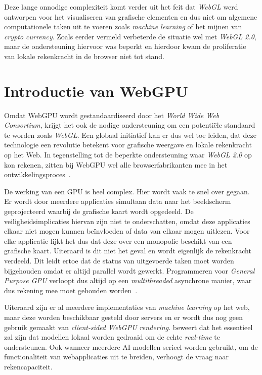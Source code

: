 \bigbreak{}

Deze lange onnodige complexiteit komt verder uit het feit dat \textit{WebGL} werd ontworpen voor het visualiseren van grafische elementen en dus niet om algemene computationele taken uit te voeren zoals \textit{machine learning} of het mijnen van \textit{crypto currency}. Zoals eerder vermeld verbeterde de situatie wel met \textit{WebGL 2.0}, maar de ondersteuning hiervoor was beperkt en hierdoor kwam de proliferatie van lokale rekenkracht in de browser niet tot stand.

\break{}

\section{Introductie van WebGPU}
\label{sec:IntroWebGPU}

Omdat WebGPU wordt gestandaardiseerd door het \textit{World Wide Web Consortium}, krijgt het ook de nodige ondersteuning om een potentiële standaard te worden zoals \textit{WebGL}. Een globaal initiatief kan er dus wel toe leiden, dat deze technologie een revolutie betekent voor grafische weergave en lokale rekenkracht op het Web. In tegenstelling tot de beperkte ondersteuning waar \textit{WebGL 2.0} op kon rekenen, zitten bij WebGPU wel alle browserfabrikanten mee in het ontwikkelingsproces~\autocite{Surma2022}.

\bigbreak{}

De werking van een GPU is heel complex. Hier wordt vaak te snel over gegaan. Er wordt door meerdere applicaties simultaan data naar het beeldscherm geprojecteerd waarbij de grafische kaart wordt opgedeeld. De veiligheidsimplicaties hiervan zijn niet te onderschatten, omdat deze applicaties elkaar niet mogen kunnen beïnvloeden of data van elkaar mogen uitlezen. Voor elke applicatie lijkt het dus dat deze over een monopolie beschikt van een grafische kaart. Uiteraard is dit niet het geval en wordt eigenlijk de rekenkracht verdeeld. Dit leidt ertoe dat de status van uitgevoerde taken moet worden bijgehouden omdat er altijd parallel wordt gewerkt. Programmeren voor \textit{General Purpose GPU} verloopt dus altijd op een \textit{multithreaded} asynchrone manier, waar dus rekening mee moet gehouden worden~\autocite{Surma2022}.

\bigbreak{}

Uiteraard zijn er al meerdere implementaties van \textit{machine learning} op het web, maar deze worden beschikbaar gesteld door servers en er wordt dus nog geen gebruik gemaakt van \textit{client-sided WebGPU rendering}. \textcite{Fleetwood2023a} beweert dat het essentieel zal zijn dat modellen lokaal worden gedraaid om de echte \textit{real-time} te ondersteunen. Ook wanneer meerdere AI-modellen serieel worden gebruikt, om de functionaliteit van webapplicaties uit te breiden, verhoogt de vraag naar rekencapaciteit.

